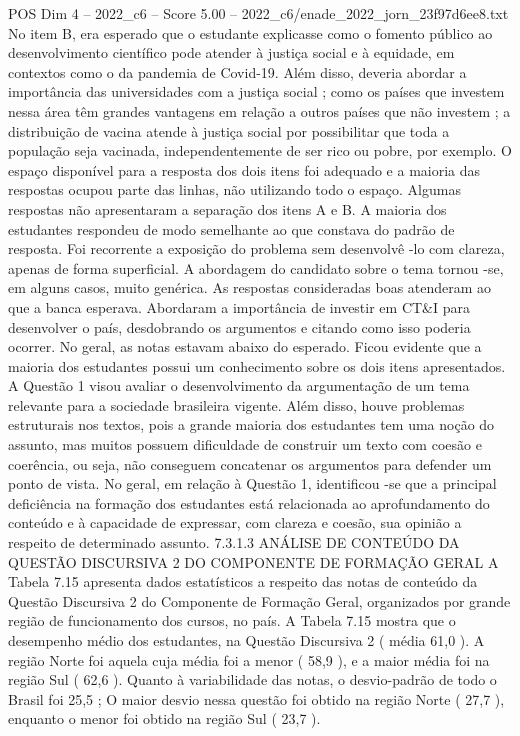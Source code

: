 \begin{textsample}{POS Dim 4 – 2022\_c6 – Score 5.00 – 2022\_c6/enade\_2022\_jorn\_23f97d6ee8.txt}
No item B, era esperado que o estudante explicasse como o fomento público ao desenvolvimento científico pode atender à justiça social e à equidade, em contextos como o da pandemia de Covid-19.
Além disso, deveria abordar a importância das universidades com a justiça social ; como os países que investem nessa área têm grandes vantagens em relação a outros países que não investem ; a distribuição de vacina atende à justiça social por possibilitar que toda a população seja vacinada, independentemente de ser rico ou pobre, por exemplo.
O espaço disponível para a resposta dos dois itens foi adequado e a maioria das respostas ocupou parte das linhas, não utilizando todo o espaço.
Algumas respostas não apresentaram a separação dos itens A e B.
A maioria dos estudantes respondeu de modo semelhante ao que constava do padrão de resposta.
Foi recorrente a exposição do problema sem desenvolvê -lo com clareza, apenas de forma superficial.
A abordagem do candidato sobre o tema tornou -se, em alguns casos, muito genérica.
As respostas consideradas boas atenderam ao que a banca esperava.
Abordaram a importância de investir em CT\&I para desenvolver o país, desdobrando os argumentos e citando como isso poderia ocorrer.
No geral, as notas estavam abaixo do esperado.
Ficou evidente que a maioria dos estudantes possui um conhecimento sobre os dois itens apresentados.
A Questão 1 visou avaliar o desenvolvimento da argumentação de um tema relevante para a sociedade brasileira vigente.
Além disso, houve problemas estruturais nos textos, pois a grande maioria dos estudantes tem uma noção do assunto, mas muitos possuem dificuldade de construir um texto com coesão e coerência, ou seja, não conseguem concatenar os argumentos para defender um ponto de vista.
No geral, em relação à Questão 1, identificou -se que a principal deficiência na formação dos estudantes está relacionada ao aprofundamento do conteúdo e à capacidade de expressar, com clareza e coesão, sua opinião a respeito de determinado assunto. 7.3.1.3 ANÁLISE DE CONTEÚDO DA QUESTÃO DISCURSIVA 2 DO COMPONENTE DE FORMAÇÃO GERAL A Tabela 7.15 apresenta dados estatísticos a respeito das notas de conteúdo da Questão Discursiva 2 do Componente de Formação Geral, organizados por grande região de funcionamento dos cursos, no país.
A Tabela 7.15 mostra que o desempenho médio dos estudantes, na Questão Discursiva 2 ( média 61,0 ).
A região Norte foi aquela cuja média foi a menor ( 58,9 ), e a maior média foi na região Sul ( 62,6 ).
Quanto à variabilidade das notas, o desvio-padrão de todo o Brasil foi 25,5 ; O maior desvio nessa questão foi obtido na região Norte ( 27,7 ), enquanto o menor foi obtido na região Sul ( 23,7 ).

\end{textsample}
